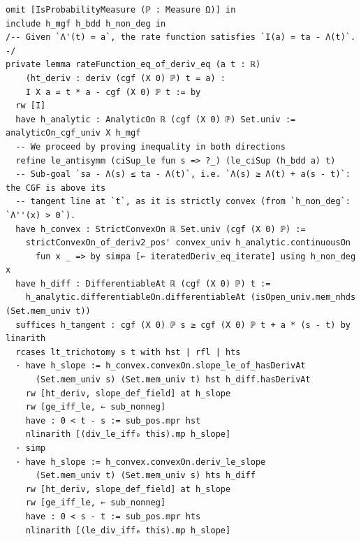 \begin{lstlisting}
omit [IsProbabilityMeasure (ℙ : Measure Ω)] in
include h_mgf h_bdd h_non_deg in
/-- Given `Λ'(t) = a`, the rate function satisfies `I(a) = ta - Λ(t)`. -/
private lemma rateFunction_eq_of_deriv_eq (a t : ℝ)
    (ht_deriv : deriv (cgf (X 0) ℙ) t = a) :
    I X a = t * a - cgf (X 0) ℙ t := by
  rw [I]
  have h_analytic : AnalyticOn ℝ (cgf (X 0) ℙ) Set.univ := analyticOn_cgf_univ X h_mgf
  -- We proceed by proving inequality in both directions
  refine le_antisymm (ciSup_le fun s => ?_) (le_ciSup (h_bdd a) t)
  -- Sub-goal `sa - Λ(s) ≤ ta - Λ(t)`, i.e. `Λ(s) ≥ Λ(t) + a(s - t)`: the CGF is above its
  -- tangent line at `t`, as it is strictly convex (from `h_non_deg`: `Λ''(x) > 0`).
  have h_convex : StrictConvexOn ℝ Set.univ (cgf (X 0) ℙ) :=
    strictConvexOn_of_deriv2_pos' convex_univ h_analytic.continuousOn
      fun x _ => by simpa [← iteratedDeriv_eq_iterate] using h_non_deg x
  have h_diff : DifferentiableAt ℝ (cgf (X 0) ℙ) t :=
    h_analytic.differentiableOn.differentiableAt (isOpen_univ.mem_nhds (Set.mem_univ t))
  suffices h_tangent : cgf (X 0) ℙ s ≥ cgf (X 0) ℙ t + a * (s - t) by linarith
  rcases lt_trichotomy s t with hst | rfl | hts
  · have h_slope := h_convex.convexOn.slope_le_of_hasDerivAt
      (Set.mem_univ s) (Set.mem_univ t) hst h_diff.hasDerivAt
    rw [ht_deriv, slope_def_field] at h_slope
    rw [ge_iff_le, ← sub_nonneg]
    have : 0 < t - s := sub_pos.mpr hst
    nlinarith [(div_le_iff₀ this).mp h_slope]
  · simp
  · have h_slope := h_convex.convexOn.deriv_le_slope
      (Set.mem_univ t) (Set.mem_univ s) hts h_diff
    rw [ht_deriv, slope_def_field] at h_slope
    rw [ge_iff_le, ← sub_nonneg]
    have : 0 < s - t := sub_pos.mpr hts
    nlinarith [(le_div_iff₀ this).mp h_slope]
\end{lstlisting}
\newpage
